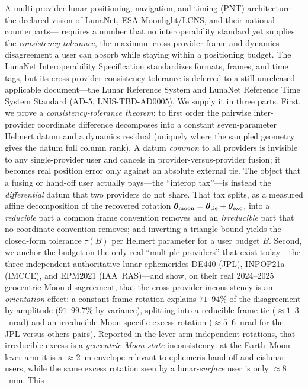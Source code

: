 A multi-provider lunar positioning, navigation, and timing (PNT) architecture---the
declared vision of LunaNet, ESA Moonlight/LCNS, and their national counterparts---%
requires a number that no interoperability standard yet supplies: the
\emph{consistency tolerance}, the maximum cross-provider frame-and-dynamics
disagreement a user can absorb while staying within a positioning budget. The
LunaNet Interoperability Specification standardizes formats, frames, and time tags,
but its cross-provider consistency tolerance is deferred to a still-unreleased
applicable document---the Lunar Reference System and LunaNet Reference Time System
Standard (AD-5, {LNIS-TBD-AD0005}). We supply it in three parts. First, we prove a
\emph{consistency-tolerance theorem}: to first order the pairwise inter-provider
coordinate difference decomposes into a constant seven-parameter Helmert datum and a
dynamics residual (uniquely where the sampled geometry gives the datum full column
rank). A datum \emph{common} to all providers is invisible to any single-provider
user and cancels in provider-versus-provider fusion; it becomes real position error
only against an absolute external tie. The object that a fusing or hand-off user
actually pays---the ``interop tax''---is instead the \emph{differential} datum that
two providers do not share. That tax splits, as a measured affine decomposition of
the recovered rotation $\bm{\theta}_{\mathrm{moon}}=\bm{\theta}_{\mathrm{tie}}+\bm{\theta}_{\mathrm{exc}}$,
into a \emph{reducible} part a common frame convention removes and an
\emph{irreducible} part that no coordinate convention removes; and inverting a
triangle bound yields the closed-form tolerance $\tau(B)$ per Helmert parameter for a
user budget $B$. Second, we anchor the budget on the only real ``multiple providers''
that exist today---the three independent authoritative lunar ephemerides DE440 (JPL),
INPOP21a (IMCCE), and EPM2021 (IAA~RAS)---and show, on their real 2024--2025
geocentric-Moon disagreement, that the cross-provider inconsistency is an
\emph{orientation} effect: a constant frame rotation explains $71$--$94\%$ of the
disagreement by amplitude ($91$--$99.7\%$ by variance), splitting into a reducible
frame-tie ($\approx\!1$--$3$~nrad) and an irreducible Moon-specific excess rotation
($\approx\!5$--$6$~nrad for the JPL-versus-others pairs). Reported in the
lever-arm-independent rotations, that irreducible excess is a
\emph{geocentric-Moon-state} inconsistency: at the Earth--Moon lever arm it is a
$\approx\!2$~m envelope relevant to ephemeris hand-off and cislunar users, while the
same excess rotation seen by a lunar-\emph{surface} user is only $\approx\!8$~mm. This
